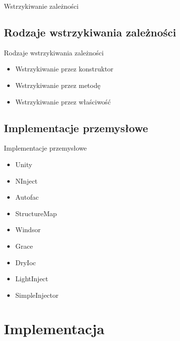\documentclass{beamer}
\begin{document}
\begin{frame}{}
\begin{center}
\huge{Wstrzykiwanie zależności}
\end{center}
\end{frame}

\subsection*{Rodzaje wstrzykiwania zależności}

\begin{frame}{Rodzaje wstrzykiwania zależności}
\begin{itemize}
	\item Wstrzykiwanie przez konstruktor
	\item Wstrzykiwanie przez metodę
	\item Wstrzykiwanie przez właściwość
\end{itemize}
\end{frame}


\subsection*{Implementacje przemysłowe}

\begin{frame}{Implementacje przemysłowe}
\begin{itemize}
	\item Unity
	\item NInject
	\item Autofac
	\item StructureMap
	\item Windsor
	\item Grace
	\item DryIoc
	\item LightInject
	\item SimpleInjector
\end{itemize}
\end{frame}



\section{Implementacja}
\end{document}
